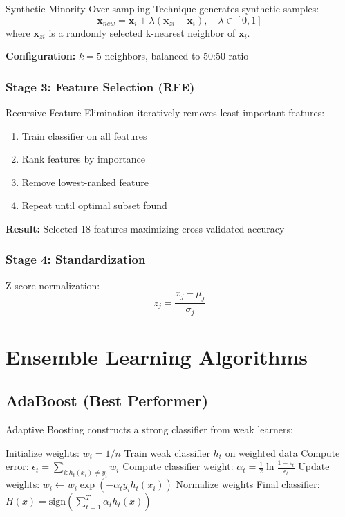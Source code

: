 \documentclass[11pt,a4paper]{article}
\begin{document}
Synthetic Minority Over-sampling Technique \citep{chawla2002smote} generates synthetic samples:
\begin{equation}
\mathbf{x}_{new} = \mathbf{x}_i + \lambda (\mathbf{x}_{zi} - \mathbf{x}_i), \quad \lambda \in [0, 1]
\end{equation}
where $\mathbf{x}_{zi}$ is a randomly selected k-nearest neighbor of $\mathbf{x}_i$.

\textbf{Configuration:} $k=5$ neighbors, balanced to 50:50 ratio

\subsubsection{Stage 3: Feature Selection (RFE)}

Recursive Feature Elimination \citep{guyon2002gene} iteratively removes least important features:
\begin{enumerate}
    \item Train classifier on all features
    \item Rank features by importance
    \item Remove lowest-ranked feature
    \item Repeat until optimal subset found
\end{enumerate}

\textbf{Result:} Selected 18 features maximizing cross-validated accuracy

\subsubsection{Stage 4: Standardization}

Z-score normalization:
\begin{equation}
z_j = \frac{x_j - \mu_j}{\sigma_j}
\end{equation}

\section{Ensemble Learning Algorithms}

\subsection{AdaBoost (Best Performer)}

Adaptive Boosting \citep{freund1997decision} constructs a strong classifier from weak learners:

\begin{algorithm}[H]
\caption{AdaBoost Algorithm}
\begin{algorithmic}[1]
\State Initialize weights: $w_i = 1/n$
    \State Train weak classifier $h_t$ on weighted data
    \State Compute error: $\epsilon_t = \sum_{i: h_t(x_i) \neq y_i} w_i$
    \State Compute classifier weight: $\alpha_t = \frac{1}{2} \ln \frac{1-\epsilon_t}{\epsilon_t}$
    \State Update weights: $w_i \leftarrow w_i \exp(-\alpha_t y_i h_t(x_i))$
    \State Normalize weights
\EndFor
\State Final classifier: $H(x) = \text{sign}\left(\sum_{t=1}^T \alpha_t h_t(x)\right)$
\end{algorithmic}
\end{algorithm}
\end{document}
